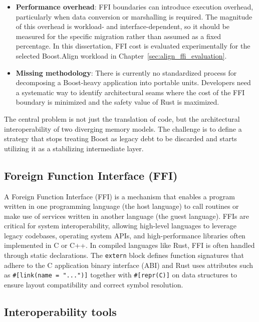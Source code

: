 \begin{itemize}
    \item \textbf{Performance overhead}: FFI boundaries can introduce execution overhead, particularly when
    data conversion or marshalling is required. The magnitude of this overhead is workload- and interface-dependent,
    so it should be measured for the specific migration rather than assumed as a fixed percentage. In this dissertation,
    FFI cost is evaluated experimentally for the selected Boost.Align workload in Chapter~\ref{sec:align_ffi_evaluation}.\parencite{rust_ffi}
    \item \textbf{Missing methodology}: There is currently no standardized process for decomposing a Boost-heavy 
    application into portable units. Developers need a systematic way to identify architectural seams where the cost of 
    the FFI boundary is minimized and the safety value of Rust is maximized.
\end{itemize}

The central problem is not just the translation of code, but the architectural interoperability of two diverging 
memory models. 
The challenge is to define a strategy that stops treating Boost as legacy debt to be discarded and starts utilizing it 
as a stabilizing intermediate layer.

\subsection{Foreign Function Interface (FFI)}
A Foreign Function Interface (FFI) is a mechanism that enables a program written in one programming language (the host language) 
to call routines or make use of services written in another language (the guest language). 
FFIs are critical for system interoperability, allowing high-level languages to leverage legacy codebases, operating system APIs, 
and high-performance libraries often implemented in C or C++. \parencite{cpp_abi}
In compiled languages like Rust, FFI is often handled through static declarations. 
The \texttt{extern} block defines function signatures that adhere to the C application binary interface (ABI) and 
Rust uses attributes such as \texttt{\#[link(name = "...")]} together with \texttt{\#[repr(C)]} 
on data structures to ensure layout compatibility and correct symbol resolution. \parencite{docs_rs}

\subsection{Interoperability tools}

